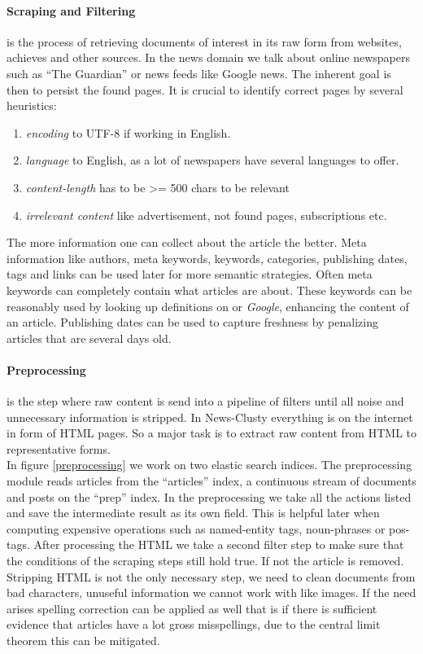   \paragraph{Scraping and Filtering} is the process of retrieving documents of interest in its raw form from websites, achieves and other sources. In the news domain we talk about online newspapers such as ``The Guardian'' or news feeds like Google news. The inherent goal is then to persist the found pages. It is crucial to identify correct pages by several heuristics:

  \begin{enumerate}
    \item \emph{encoding} to UTF-8 if working in English.
    \item \emph{language} to English, as a lot of newspapers have several languages to offer.
    \item \emph{content-length} has to be >= 500 chars to be relevant
    \item \emph{irrelevant content} like advertisement, not found pages, subscriptions etc.
  \end{enumerate}

  The more information one can collect about the article the better. Meta information like authors, meta keywords, keywords, categories, publishing dates, tags and links can be used later for more semantic strategies. Often meta keywords can completely contain what articles are about. These keywords can be reasonably used by looking up definitions on \wiki{} or \emph{Google}, enhancing the content of an article. Publishing dates can be used to capture freshness by penalizing articles that are several days old.

  \paragraph{Preprocessing} is the step where raw content is send into a pipeline of filters until all noise and unnecessary information is stripped. In News-Clusty everything is on the internet in form of HTML pages. So a major task is to extract raw content from HTML to representative forms.\\
  In figure \ref{preprocessing} we work on two elastic search indices. The preprocessing module reads articles from the ``articles'' index, a continuous stream of documents and posts on the ``prep'' index. In the preprocessing we take all the actions listed and save the intermediate result as its own field. This is helpful later when computing expensive operations such as named-entity tags, noun-phrases or pos-tags. After processing the HTML we take a second filter step to make sure that the conditions of the scraping steps still hold true. If not the article is removed. Stripping HTML is not the only necessary step, we need to clean documents from bad characters, unuseful information we cannot work with like images. If the need arises spelling correction can be applied as well that is if there is sufficient evidence that articles have a lot gross misspellings, due to the central limit theorem this can be mitigated.

